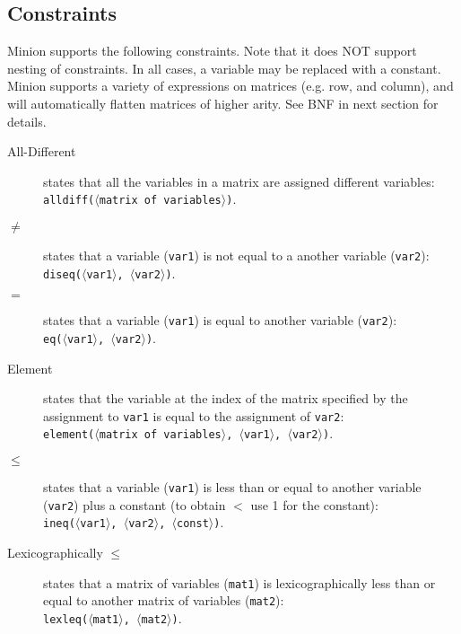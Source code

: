 \documentclass{article}
\begin{document}
\begin{small}
\section{Constraints}
{\sc Minion} supports the following constraints. Note that it does NOT
support nesting of constraints. In all cases, a variable may be
replaced with a constant. {\sc Minion} supports a variety of
expressions on matrices (e.g. row, and column), and will automatically
flatten matrices of higher arity. See BNF in next section for details.

\begin{description}
\item[All-Different] states that all the variables in a matrix are
assigned different variables:\\ 
\texttt{alldiff($\langle$matrix of
variables$\rangle$)}.

\item[$ \mathbf{\neq}$] states that a variable (\texttt{var1}) is not
equal to a another variable (\texttt{var2}):\\
\texttt{diseq($\langle$var1$\rangle$, $\langle$var2$\rangle$)}.

\item[$\mathbf{=}$] states that a variable (\texttt{var1}) is equal to
another variable (\texttt{var2}):\\
\texttt{eq($\langle$var1$\rangle$, $\langle$var2$\rangle$)}.

\item[Element] states that the variable at the index of the matrix
specified by the assignment to \texttt{var1} is equal to the
assignment of \texttt{var2}:\\ \texttt{element($\langle$matrix of
variables$\rangle$, $\langle$var1$\rangle$, $\langle$var2$\rangle$)}.

\item[$\mathbf{\leq}$] states that a variable (\texttt{var1}) is less
than or equal to another variable (\texttt{var2}) plus a constant (to
obtain $<$ use 1 for the constant):\\
\texttt{ineq($\langle$var1$\rangle$, $\langle$var2$\rangle$,
$\langle$const$\rangle$)}.

\item[Lexicographically $\mathbf{\leq}$] states that a matrix of
variables (\texttt{mat1}) is lexicographically less than or equal to
another matrix of variables (\texttt{mat2}):\\
\texttt{lexleq($\langle$mat1$\rangle$, $\langle$mat2$\rangle$)}.


\end{description}
\end{small}
\end{document}
